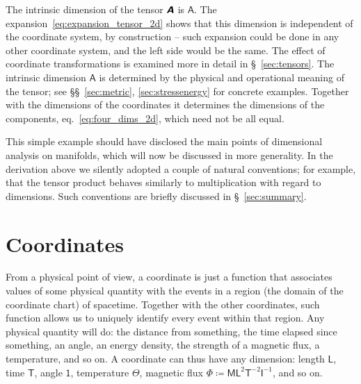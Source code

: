 \documentclass[\ifafour a4paper,12pt,\else a5paper,10pt,\fi%
onecolumn,oneside,article,%
british%
]{memoir}
\theoremstyle{remark}
\theoremstyle{innote}
\newcommand*{\mathte}[1]{\textbf{\textit{\textsf{#1}}}}
\newcommand*{\defd}{\coloneqq}
\renewcommand*{\|}[1][]{\nonscript\,#1\vert\nonscript\;\mathopen{}}
\newcommand*{\sect}{\S}%
\newcommand*{\sects}{\S\S}%
\newcommand*{\eqn}{eq.}%
\newcommand*{\Un}{\textsf{1}}
\newcommand*{\Le}{\textsf{L}}
\newcommand*{\Ti}{\textsf{T}}
\newcommand*{\Ma}{\textsf{M}}
\newcommand*{\Te}{\Theta}
\newcommand*{\Cu}{\textsf{I}}
\newcommand*{\Fl}{\Phi}
\newcommand*{\Aa}{\textsf{A}}
\newcommand*{\yA}{\mathte{A}}
\renewcommand*{\i}{\indices}
\begin{document}
The intrinsic dimension of the tensor $\yA$ is $\Aa$. The
expansion~\eqref{eq:expansion_tensor_2d} shows that this dimension is
independent of the coordinate system, by construction -- such expansion
could be done in any other coordinate system, and the left side would be
the same. The effect of coordinate transformations is examined more in
detail in \sect~\ref{sec:tensors}. The intrinsic dimension $\Aa$ is
determined by the physical and operational meaning of the tensor; see
\sects~\ref{sec:metric}, \ref{sec:stressenergy} for concrete examples.
Together with the dimensions of the coordinates it determines the
dimensions of the components, \eqn~\eqref{eq:four_dims_2d}, which need not
be all equal.

This simple example should have disclosed the main points of dimensional
analysis on manifolds, which will now be discussed in more generality.
In the derivation above we silently adopted a couple of natural
conventions; for example, that the tensor product behaves similarly to
multiplication with regard to dimensions. Such conventions are briefly
discussed in \sect~\ref{sec:summary}.





\section{Coordinates}
\label{sec:coords}

From a physical point of view, a coordinate is just a function that
associates values of some physical quantity with the events in a region
(the domain of the coordinate chart) of spacetime. Together with the other
coordinates, such function allows us to uniquely identify every event
within that region. Any physical quantity will do: the distance from
something, the time elapsed since something, an angle, an energy density,
the strength of a magnetic flux, a temperature, and so on. A coordinate can
thus have any dimension: length $\Le$, time $\Ti$, angle $\Un$, temperature
$\Te$, magnetic flux $\Fl \defd \Ma\Le^{2}\Ti^{-2}\Cu^{-1}$, and so on.
\end{document}
